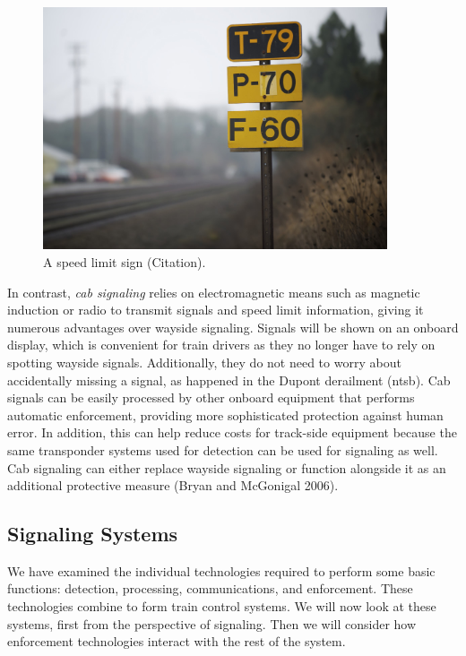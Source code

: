 \documentclass[11pt, titlepage]{article}
\begin{document}
\begin{figure}[ht]
    \begin{center}
        \includegraphics[width=4in]{SpeedLimits.png}
        \caption[Speed Limit Sign]{A speed limit sign (Citation).}
    \end{center}
\end{figure}

In contrast, \textit{cab signaling} relies on electromagnetic means such as
magnetic induction or radio to transmit signals and speed limit information, giving
it numerous advantages over wayside signaling. Signals will be shown on an onboard
display, which is convenient for train drivers as they no longer have to rely on
spotting wayside signals. Additionally, they do not need to worry about
accidentally missing a signal, as happened in the Dupont derailment (ntsb). Cab
signals can be easily processed by other onboard equipment that performs automatic
enforcement, providing more sophisticated protection against human error. In
addition, this can help reduce costs for track-side equipment because the same
transponder systems used for detection can be used for signaling as well. Cab
signaling can either replace wayside signaling or function alongside it as an
additional protective measure (Bryan and McGonigal 2006).

\subsection{Signaling Systems}

We have examined the individual technologies required to perform some basic
functions: detection, processing, communications, and enforcement. These
technologies combine to form train control systems. We will now look at these
systems, first from the perspective of signaling. Then we will consider how
enforcement technologies interact with the rest of the system.
\end{document}

